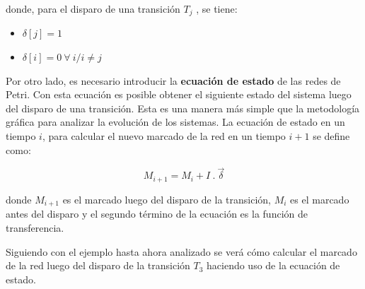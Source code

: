 \noindent donde, para el disparo de una transición $T_j$ , se tiene:
\begin{itemize}
    \item $\delta[j] = 1$
    \item $\delta[i] = 0 \ \forall \ i/i \neq j$
\end{itemize}

Por otro lado, es necesario introducir la \textbf{ecuación de estado} de las redes de Petri. Con esta ecuación es posible obtener el siguiente estado del sistema luego del disparo de una transición. Esta es una manera más simple que la metodología gráfica para analizar la evolución de los sistemas. La ecuación de estado en un tiempo $i$, para calcular el nuevo marcado de la red en un tiempo $i+1$ se define como:

\begin{equation}
    M_{i+1} = M_i + I \ . \ \vec{\delta}
    \label{ec:estado}
\end{equation}

\noindent donde $M_{i+1}$ es el marcado luego del disparo de la transición, $M_i$ es el marcado antes del disparo y el segundo término de la ecuación es la función de transferencia.

Siguiendo con el ejemplo hasta ahora analizado se verá cómo calcular el marcado de la red luego del disparo de la transición $T_3$ haciendo uso de la ecuación de estado.

